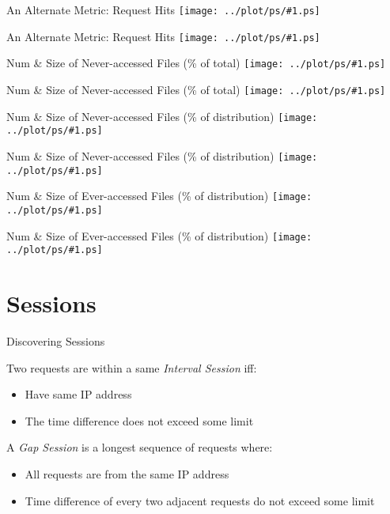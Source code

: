 \documentclass{beamer}
\newcommand\graph[1]{{\texttt{[image: ../plot/ps/\#1.ps]}}}
\begin{document}
\begin{frame}{An Alternate Metric: Request Hits}
\graph{file-req-four-acc}
\end{frame}

\begin{frame}{An Alternate Metric: Request Hits}
\graph{file-req-four-acc-log}
\end{frame}

\begin{frame}{Num \& Size of Never-accessed Files (\% of total)}
\graph{file-dist-never-req}
\end{frame}

\begin{frame}{Num \& Size of Never-accessed Files (\% of total)}
\graph{file-dist-never-req-traffic}
\end{frame}

\begin{frame}{Num \& Size of Never-accessed Files (\% of distribution)}
\graph{file-dist-never-req-percent}
\end{frame}

\begin{frame}{Num \& Size of Never-accessed Files (\% of distribution)}
\graph{file-dist-never-req-percent-traffic}
\end{frame}

\begin{frame}{Num \& Size of Ever-accessed Files (\% of distribution)}
\graph{file-dist-ever-req-percent}
\end{frame}

\begin{frame}{Num \& Size of Ever-accessed Files (\% of distribution)}
\graph{file-dist-ever-req-percent-traffic}
\end{frame}

\section{Sessions}

\begin{frame}{Discovering Sessions}
\begin{definition}
Two requests are within a same \emph{Interval Session} iff:
\begin{itemize}
  \item Have same IP address
  \item The time difference does not exceed some limit
\end{itemize}
\end{definition}

\begin{definition}
A \emph{Gap Session} is a longest sequence of requests where:
\begin{itemize}
  \item All requests are from the same IP address
  \item Time difference of every two adjacent requests do not exceed some limit
\end{itemize}
\end{definition}
\end{frame}
\end{document}

